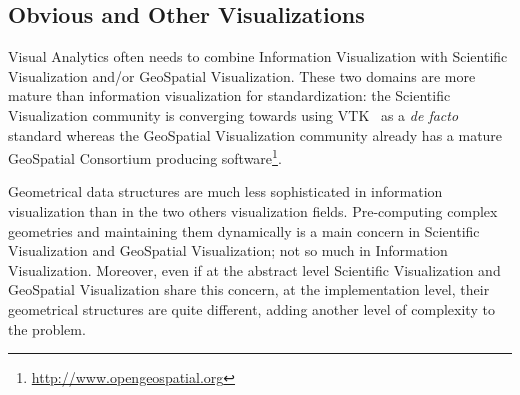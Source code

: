 \begin{comment}
\subsection{Community Building}

Perhaps the most novel experience we retain from Obvious is the
community-driven process to reach consensus and realize a reference
implementation.  In many respects, this process is akin to a
standardization process, only it lacks the industry incentive and
backing. Like open source projects, we shall only count on voluntary
contributions (aside partial of funding from public research grants),
only, in the present state of toolkits, it is much more tempting to
devise and expand one's own toolkit than contribute and make
compromise to use a shared design which still lacks serious adoption.

We intend to experiment on various means to carry this
community-driven consensus building, to see how it can help
consolidate acquired experience in the craft of toolkit design.

As an afterthought, we find such consolidation effort is rarely found
in research domains, and yet should surely help make the field more
visible and readable from an outsider perspective.
\end{comment}

\subsection{Obvious and Other Visualizations}

Visual Analytics often needs to combine Information Visualization with
Scientific Visualization and/or GeoSpatial Visualization.  These two
domains are more mature than information visualization for
standardization: the Scientific Visualization community is converging
towards using VTK~\cite{VTK} as a \textit{de facto} standard whereas
the GeoSpatial Visualization community already has a mature GeoSpatial
Consortium producing
software\footnote{\url{http://www.opengeospatial.org}}.

Geometrical data structures are much less sophisticated in information
visualization than in the two others visualization fields.
Pre-computing complex geometries and maintaining them dynamically is a
main concern in Scientific Visualization and GeoSpatial Visualization;
not so much in Information Visualization.  Moreover, even if at the
abstract level Scientific Visualization and GeoSpatial Visualization
share this concern, at the implementation level, their geometrical
structures are quite different, adding another level of complexity to
the problem.

